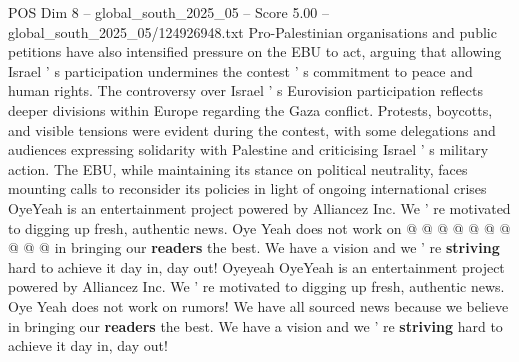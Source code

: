 \begin{textsample}{POS Dim 8 – global\_south\_2025\_05 – Score 5.00 – global\_south\_2025\_05/124926948.txt}
Pro-Palestinian organisations and public petitions have also intensified pressure on the EBU to act, arguing that allowing Israel ' s participation undermines the contest ' s commitment to peace and human rights.
The controversy over Israel ' s Eurovision participation reflects deeper divisions within Europe regarding the Gaza conflict.
Protests, boycotts, and visible tensions were evident during the contest, with some delegations and audiences expressing solidarity with Palestine and criticising Israel ' s military action.
The EBU, while maintaining its stance on political neutrality, faces mounting calls to reconsider its policies in light of ongoing international crises OyeYeah is an entertainment project powered by Alliancez Inc.
We ' re motivated to digging up fresh, authentic news.
Oye Yeah does not work on @ @ @ @ @ @ @ @ @ @ in bringing our \textbf{readers} the best.
We have a vision and we ' re \textbf{striving} hard to achieve it day in, day out!
Oyeyeah OyeYeah is an entertainment project powered by Alliancez Inc.
We ' re motivated to digging up fresh, authentic news.
Oye Yeah does not work on rumors!
We have all sourced news because we believe in bringing our \textbf{readers} the best.
We have a vision and we ' re \textbf{striving} hard to achieve it day in, day out!

\end{textsample}
